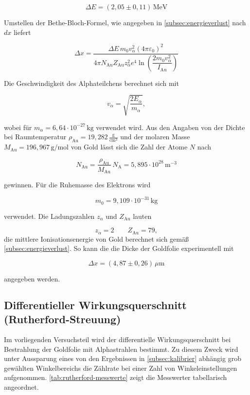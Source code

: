 \[
\Delta E = (2{,}05 \pm 0{,}11)\,\mathrm{MeV}
\]

Umstellen der Bethe-Bloch-Formel, wie angegeben in \autoref{subsec:energieverlust} nach $dx$ liefert

\[
\Delta x
=
\frac{\Delta E\,m_0 v_{\alpha}^{2}(4\pi\varepsilon_0)^2}
{4\pi N_{\mathrm{Au}} Z_{\mathrm{Au}} z_{\alpha}^{2}e^{4}
\ln\!\left(\dfrac{2m_0v_{\alpha}^{2}}{I_{\mathrm{Au}}}\right)}
\]

Die Geschwindigkeit des Alphateilchens berechnet sich mit 

\[
v_{\alpha} = \sqrt{\frac{2E_{\alpha}}{m_{\alpha}}},
\]

wobei für $m_{\alpha} = 6{,}64 \cdot 10^{-27}\,\mathrm{kg}$ \cite{leifiAlpha} verwendet wird.
Aus den Angaben von der Dichte bei Raumtemperatur $\rho_{\mathrm{Au}} = 19{,}282\,\frac{\mathrm{g}}{\mathrm{cm}^3}$ 
und der molaren Masse $M_{\mathrm{Au}} = 196{,}967\,\mathrm{g/mol}$ von Gold \cite{webqcGold} lässt sich die Zahl der Atome $N$ nach 

\[
N_{\mathrm{Au}}
=
\frac{\rho_{\mathrm{Au}}}{M_{\mathrm{Au}}}\,N_{\mathrm{A}}
=
5{,}895 \cdot 10^{28}\,\mathrm{m}^{-3}
\]

gewinnen.
Für die Ruhemasse des Elektrons \cite{chemiedeElektron} wird 

\[
m_0 = 9{,}109 \cdot 10^{-31}\,\mathrm{kg}
\]

verwendet.
Die Ladungszahlen $z_{\alpha}$ und $Z_{\mathrm{Au}}$ lauten

\[
z_{\alpha} = 2
\qquad
Z_{\mathrm{Au}} = 79,
\]
die mittlere Ionisationsenergie von Gold berechnet sich gemäß \autoref{subsec:energieverlust}.
So kann die die Dicke der Goldfolie experimentell mit 

\[
\Delta x = (4{,}87 \pm 0{,}26)\,\mu\mathrm{m}
\]

angegeben werden.




\subsection{Differentieller Wirkungsquerschnitt (Rutherford-Streuung)}

Im vorliegenden Versuchsteil wird der differentielle Wirkungsquerschnitt bei Bestrahlung der Goldfolie mit Alphastrahlen bestimmt.
Zu diesem Zweck wird unter Aussparung eines von den Ergebnissen in \autoref{subsec:kalibrier} abhängig grob gewählten Winkelbereichs 
die Zählrate bei einer Zahl von Winkeleinstellungen aufgenommen. \autoref{tab:rutherford-messwerte} zeigt die Messwerter tabellarisch angeordnet. 

